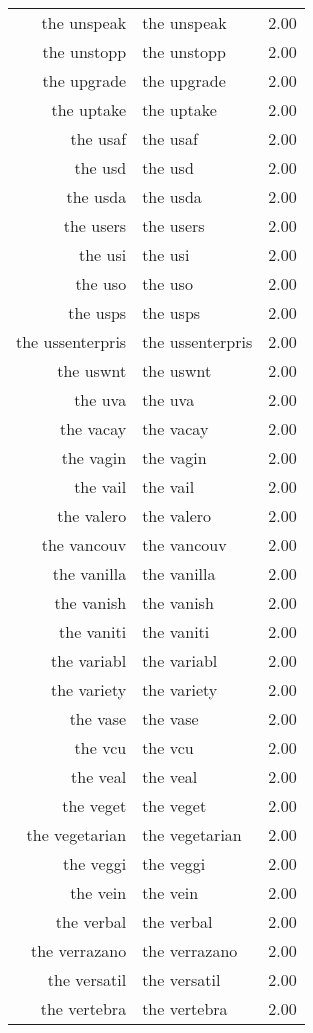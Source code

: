\begin{table}[ht]
\begin{tabular}{rlr}
  the unspeak & the unspeak & 2.00 \\ 
  the unstopp & the unstopp & 2.00 \\ 
  the upgrade & the upgrade & 2.00 \\ 
  the uptake & the uptake & 2.00 \\ 
  the usaf & the usaf & 2.00 \\ 
  the usd & the usd & 2.00 \\ 
  the usda & the usda & 2.00 \\ 
  the users & the users & 2.00 \\ 
  the usi & the usi & 2.00 \\ 
  the uso & the uso & 2.00 \\ 
  the usps & the usps & 2.00 \\ 
  the ussenterpris & the ussenterpris & 2.00 \\ 
  the uswnt & the uswnt & 2.00 \\ 
  the uva & the uva & 2.00 \\ 
  the vacay & the vacay & 2.00 \\ 
  the vagin & the vagin & 2.00 \\ 
  the vail & the vail & 2.00 \\ 
  the valero & the valero & 2.00 \\ 
  the vancouv & the vancouv & 2.00 \\ 
  the vanilla & the vanilla & 2.00 \\ 
  the vanish & the vanish & 2.00 \\ 
  the vaniti & the vaniti & 2.00 \\ 
  the variabl & the variabl & 2.00 \\ 
  the variety & the variety & 2.00 \\ 
  the vase & the vase & 2.00 \\ 
  the vcu & the vcu & 2.00 \\ 
  the veal & the veal & 2.00 \\ 
  the veget & the veget & 2.00 \\ 
  the vegetarian & the vegetarian & 2.00 \\ 
  the veggi & the veggi & 2.00 \\ 
  the vein & the vein & 2.00 \\ 
  the verbal & the verbal & 2.00 \\ 
  the verrazano & the verrazano & 2.00 \\ 
  the versatil & the versatil & 2.00 \\ 
  the vertebra & the vertebra & 2.00 \\ 

\end{tabular}
\end{table}
